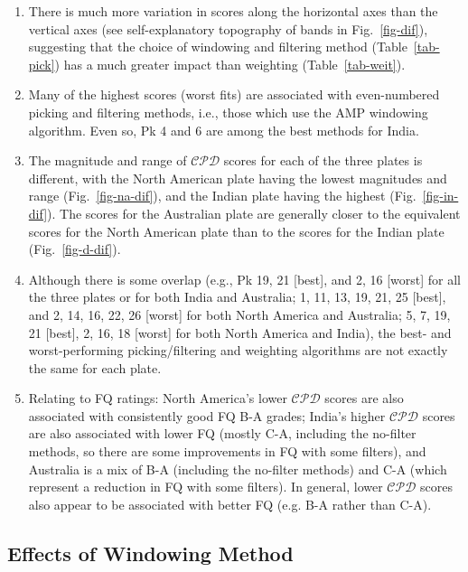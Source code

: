 \begin{enumerate}
  \item There is much more variation in scores along the horizontal axes than
    the vertical axes (see self-explanatory topography of bands in
    Fig.~\ref{fig-dif}), suggesting that the choice of windowing and filtering
    method (Table~\ref{tab-pick}) has a much greater impact than weighting
    (Table~\ref{tab-weit}).
  \item Many of the highest scores (worst fits) are associated with
    even-numbered picking and filtering methods, i.e., those which use the AMP
    windowing algorithm. Even so, Pk 4 and 6 are among the best methods for
    India.
  \item The magnitude and range of $\mathcal{CPD}$ scores for each of the three
    plates is different, with the North American plate having the lowest
    magnitudes and range (Fig.~\ref{fig-na-dif}), and the Indian plate having
    the highest (Fig.~\ref{fig-in-dif}). The scores for the Australian plate are
    generally closer to the equivalent scores for the North American plate than
    to the scores for the Indian plate (Fig.~\ref{fig-d-dif}).
  \item Although there is some overlap (e.g., Pk 19, 21 [best], and 2, 16
    [worst] for all the three plates or for both India and Australia; 1, 11, 13,
    19, 21, 25 [best], and 2, 14, 16, 22, 26 [worst] for both North America and
    Australia; 5, 7, 19, 21 [best], 2, 16, 18 [worst] for both North America and
    India), the best- and worst-performing picking/filtering and weighting
    algorithms are not exactly the same for each plate.
  \item Relating to FQ ratings: North America's lower $\mathcal{CPD}$ scores are
    also associated with consistently good FQ B-A grades; India's higher
    $\mathcal{CPD}$ scores are also associated with lower FQ (mostly C-A,
    including the no-filter methods, so there are some improvements in FQ with
    some filters), and Australia is a mix of B-A (including the no-filter
    methods) and C-A (which represent a reduction in FQ with some filters). In
    general, lower $\mathcal{CPD}$ scores also appear to be associated with
    better FQ (e.g. B-A rather than C-A).
\end{enumerate}

\subsection{Effects of Windowing Method}

